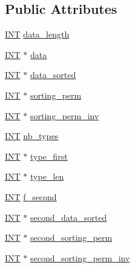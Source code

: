 \subsection*{Public Attributes}
\begin{DoxyCompactItemize}
\item 
\mbox{\hyperlink{galois_8h_a09fddde158a3a20bd2dcadb609de11dc}{I\+NT}} \mbox{\hyperlink{classclassify_ab158a9b2f44f53932642a53bec3c4cc3}{data\+\_\+length}}
\item 
\mbox{\hyperlink{galois_8h_a09fddde158a3a20bd2dcadb609de11dc}{I\+NT}} $\ast$ \mbox{\hyperlink{classclassify_a62862de3f6e8d1191cfdbb0af6ecfb8d}{data}}
\item 
\mbox{\hyperlink{galois_8h_a09fddde158a3a20bd2dcadb609de11dc}{I\+NT}} $\ast$ \mbox{\hyperlink{classclassify_a35df1de69673a4ca4019fb3ad1f2be5e}{data\+\_\+sorted}}
\item 
\mbox{\hyperlink{galois_8h_a09fddde158a3a20bd2dcadb609de11dc}{I\+NT}} $\ast$ \mbox{\hyperlink{classclassify_a67110c5dc7b8a0c0a6d27002ee27c4d5}{sorting\+\_\+perm}}
\item 
\mbox{\hyperlink{galois_8h_a09fddde158a3a20bd2dcadb609de11dc}{I\+NT}} $\ast$ \mbox{\hyperlink{classclassify_af1955174645c0a5ae66ade66917914b7}{sorting\+\_\+perm\+\_\+inv}}
\item 
\mbox{\hyperlink{galois_8h_a09fddde158a3a20bd2dcadb609de11dc}{I\+NT}} \mbox{\hyperlink{classclassify_a0baeeb9626a0611f111335dcaaaaad5c}{nb\+\_\+types}}
\item 
\mbox{\hyperlink{galois_8h_a09fddde158a3a20bd2dcadb609de11dc}{I\+NT}} $\ast$ \mbox{\hyperlink{classclassify_aea8eead047af96cea4ddcd00498882cb}{type\+\_\+first}}
\item 
\mbox{\hyperlink{galois_8h_a09fddde158a3a20bd2dcadb609de11dc}{I\+NT}} $\ast$ \mbox{\hyperlink{classclassify_aa154069de433b7b013b874427fd4d29f}{type\+\_\+len}}
\item 
\mbox{\hyperlink{galois_8h_a09fddde158a3a20bd2dcadb609de11dc}{I\+NT}} \mbox{\hyperlink{classclassify_aa6e463ded1524ed187815a48754f6fbc}{f\+\_\+second}}
\item 
\mbox{\hyperlink{galois_8h_a09fddde158a3a20bd2dcadb609de11dc}{I\+NT}} $\ast$ \mbox{\hyperlink{classclassify_a2c05b34e62e66b3c11ca7203e6c54785}{second\+\_\+data\+\_\+sorted}}
\item 
\mbox{\hyperlink{galois_8h_a09fddde158a3a20bd2dcadb609de11dc}{I\+NT}} $\ast$ \mbox{\hyperlink{classclassify_aacfa164863532295c85e2d46a00ab62f}{second\+\_\+sorting\+\_\+perm}}
\item 
\mbox{\hyperlink{galois_8h_a09fddde158a3a20bd2dcadb609de11dc}{I\+NT}} $\ast$ \mbox{\hyperlink{classclassify_ab8a41e6f21560b980cc46ae1f9b837b2}{second\+\_\+sorting\+\_\+perm\+\_\+inv}}

\end{DoxyCompactItemize}
